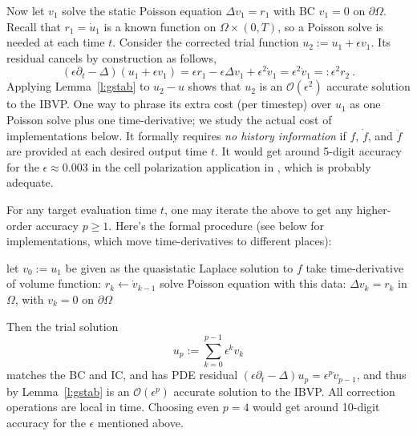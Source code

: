 \documentclass[10pt]{article}
\newcommand{\be}{\begin{equation}}
\newcommand{\ee}{\end{equation}}
\newcommand{\bigO}{{\mathcal O}}
\newcommand{\pO}{{\partial\Omega}}
\newcommand{\eps}{\epsilon}
\newcommand{\dt}{\partial_t}
\begin{document}
Now let $v_1$ solve the static Poisson equation $\Delta v_1 = r_1$ with
BC $v_1=0$ on $\pO$. Recall that $r_1=\dot u_1$ is a known function
on $\Omega \times (0,T)$, so a Poisson solve is needed at each time $t$.
Consider the corrected trial function
$u_2 := u_1 + \eps v_1$. Its residual cancels by construction as follows,
$$
(\eps\dt-\Delta)(u_1 +\eps v_1) = \eps r_1 - \eps \Delta v_1 +\eps^2 \dot v_1 =
\eps^2 \dot v_1 =: \eps^2 r_2~.
$$
Applying Lemma~\ref{l:gstab} to $u_2-u$
shows that $u_2$ is an $\bigO(\eps^2)$ accurate solution
to the IBVP.
One way to phrase its extra cost (per timestep) over $u_1$ as
one Poisson solve plus one time-derivative;
we study the actual cost of implementations below.
It formally requires {\em no history information} if $f$, $\dot f$, and
$\ddot f$ are provided at each desired output time $t$.
It would get around 5-digit accuracy for the
$\eps\approx 0.003$ in the cell polarization application in \cite{diegmiller18},
which is probably adequate.

For any target evaluation time $t$, one may iterate the above
to get any higher-order accuracy $p\ge1$. Here's the formal procedure
(see below for implementations, which move time-derivatives to different
places):

\vspace{1ex}
\colorbox[rgb]{0.9,0.9,0.9}{%
\begin{minipage}{0.9\textwidth}
\begin{algorithmic}
  \STATE let $v_0 := u_1$ be given as the quasistatic Laplace solution to $f$
  \STATE take time-derivative of volume function: \; $r_{k} \gets \dot v_{k-1}$
  \STATE solve Poisson equation with this data: \;\;\; $\Delta v_k = r_k$ in $\Omega$, with $v_k=0$ on $\pO$
  \ENDFOR
\end{algorithmic}
\end{minipage}
}%
\vspace{1ex}

Then the trial solution
\be
u_p := \sum_{k=0}^{p-1} \eps^k v_k
\label{up}
\ee
matches the BC and IC, and has PDE
residual $(\eps\dt-\Delta)u_p = \eps^p \dot v_{p-1}$,
and thus by Lemma~\ref{l:gstab} is an $\bigO(\eps^p)$ accurate solution
to the IBVP.
All correction operations are local in time.
Choosing even $p=4$ would get around 10-digit accuracy for the $\eps$
mentioned above.
\end{document}
